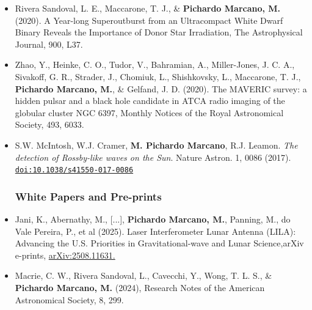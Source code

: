 \documentclass[letterpaper,10pt]{article}
\begin{document}
\begin{itemize}[label=$\blacktriangleright$]
        
        
    \item Rivera Sandoval, L. E., Maccarone, T. J., \& \textbf{Pichardo Marcano, M.} (2020). A Year-long Superoutburst from an Ultracompact White Dwarf Binary Reveals the Importance of Donor Star Irradiation, The Astrophysical Journal, 900, L37. \\

    \item Zhao, Y., Heinke, C. O., Tudor, V., Bahramian, A., Miller-Jones, J. C. A., Sivakoff, G. R., Strader, J., Chomiuk, L., Shishkovsky, L., Maccarone, T. J., \textbf{Pichardo Marcano, M.}, \& Gelfand, J. D. (2020). The MAVERIC survey: a hidden pulsar and a black hole candidate in ATCA radio imaging of the globular cluster NGC 6397, Monthly Notices of the Royal Astronomical Society, 493, 6033. \href{10.1093/mnras/staa631} \\


\item  S.W. McIntosh, W.J. Cramer, \textbf{M. Pichardo Marcano}, R.J. Leamon. \emph{The detection of Rossby-like waves on the Sun}. Nature Astron. 1, 0086 (2017). \href{http://dx.doi.org/10.1038/s41550-017-0086}{\tt doi:10.1038/s41550-017-0086} \\

\subsubsection*{White Papers and Pre-prints}


\item Jani, K., Abernathy, M., [...], \textbf{Pichardo Marcano, M.}, Panning, M., do Vale Pereira, P., et al (2025). Laser Interferometer Lunar Antenna (LILA): Advancing the U.S. Priorities in Gravitational-wave and Lunar Science,arXiv e-prints, \href{https://arxiv.org/abs/2508.11631}{arXiv:2508.11631.}












\item Macrie, C. W., Rivera Sandoval, L., Cavecchi, Y., Wong, T. L. S., \& \textbf{Pichardo Marcano, M.} (2024), Research Notes of the American Astronomical Society, 8, 299.







\end{itemize}
\end{document}
